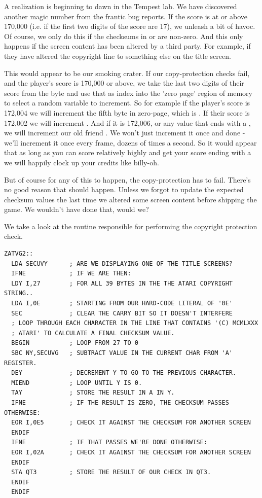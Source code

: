 A realization is beginning to dawn in the Tempest lab. We have discovered another magic number from the frantic bug reports. If the
score is at or above 170,000 (i.e. if the first two digits of the score are 17), we unleash a bit of havoc. Of course, we only do 
this if the checksums in  or  are non-zero. And this only happens if the screen content has been altered by
a third party. For example, if they have altered the copyright line to something else on the title screen. 

This would appear to be our smoking crater. If our copy-protection checks fail, and the player's score is 170,000 or above, we 
take the last two digits of their score from the byte  and use that as index into the 'zero page' region of memory
to select a random variable to increment. So for example if the player's score is 172,004 we will increment the fifth byte in zero-page,
which is . If their score is 172,002 we will increment . And if it is 172,006, or any value that ends with
a , we will increment our old friend . We won't just increment it once and done - we'll increment it once every
frame, dozens of times a second. So it would appear that as long as you can score relatively highly and get your score ending with a
 we will happily clock up your credits like billy-oh.

But of course for any of this to happen, the copy-protection has to fail. There's no good reason that should happen. Unless we forgot
to update the expected checksum values the last time we altered some screen content before shipping the game. We wouldn't have done
that, would we?

We take a look at the routine responsible for performing the copyright protection check.

\begin{lstlisting}
ZATVG2::
  LDA SECUVY      ; ARE WE DISPLAYING ONE OF THE TITLE SCREENS?
  IFNE            ; IF WE ARE THEN:
  LDY I,27        ; FOR ALL 39 BYTES IN THE THE ATARI COPYRIGHT STRING..
  LDA I,0E        ; STARTING FROM OUR HARD-CODE LITERAL OF '0E'
  SEC             ; CLEAR THE CARRY BIT SO IT DOESN'T INTERFERE
  ; LOOP THROUGH EACH CHARACTER IN THE LINE THAT CONTAINS '(C) MCMLXXX
  ; ATARI' TO CALCULATE A FINAL CHECKSUM VALUE.
  BEGIN           ; LOOP FROM 27 TO 0
  SBC NY,SECUVG   ; SUBTRACT VALUE IN THE CURRENT CHAR FROM 'A' REGISTER.
  DEY             ; DECREMENT Y TO GO TO THE PREVIOUS CHARACTER.
  MIEND           ; LOOP UNTIL Y IS 0.
  TAY             ; STORE THE RESULT IN A IN Y.
  IFNE            ; IF THE RESULT IS ZERO, THE CHECKSUM PASSES OTHERWISE:
  EOR I,0E5       ; CHECK IT AGAINST THE CHECKSUM FOR ANOTHER SCREEN
  ENDIF           
  IFNE            ; IF THAT PASSES WE'RE DONE OTHERWISE:
  EOR I,02A       ; CHECK IT AGAINST THE CHECKSUM FOR ANOTHER SCREEN
  ENDIF           
  STA QT3         ; STORE THE RESULT OF OUR CHECK IN QT3.
  ENDIF
  ENDIF
\end{lstlisting}

